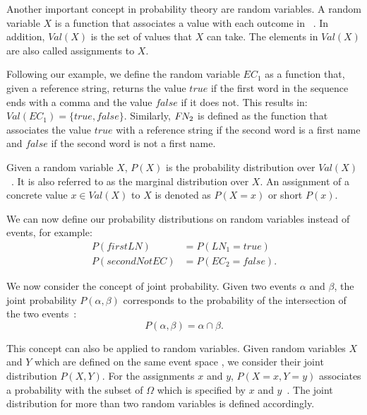 \bigskip

Another important concept in probability theory are \glspl{random variable}.
A \gls{random variable} $X$ is a \gls{function} that associates a value with each outcome in ~\cite{koller2009probabilistic}.
In addition, $\mathit{Val}(X)$ is the set of values that $X$ can take.
The elements in $\mathit{Val}(X)$ are also called \glspl{assignment} to $X$.

Following our example, we define the \gls{random variable} $EC_1$ as a \gls{function} that, given a reference string, returns the value $\mathit{true}$ if the first word in the sequence ends with a comma and the value $\mathit{false}$ if it does not.
This results in: $\mathit{Val}(EC_1)=\{\mathit{true}, \mathit{false}\}$.
Similarly, $F\hspace{-0.07em} N_2$ is defined as the function that associates the value $\mathit{true}$ with a reference string if the second word is a first name and $\mathit{false}$ if the second word is not a first name.

\bigskip

Given a \gls{random variable} $X$, $P(X)$ is the \gls{probability distribution} over $\mathit{Val}(X)$~\cite{koller2009probabilistic}.
It is also referred to as the \gls{marginal distribution} over $X$.
An \gls{assignment} of a concrete value $x\in \mathit{Val}(X)$ to $X$ is denoted as $P(X=x)$ or short $P(x)$.

We can now define our \glspl{probability distribution} on \glspl{random variable} instead of \glspl{event}, for example:
\begin{equation*}
  \begin{split}
    P(\mathit{firstLN})&= P(LN_1{=}\mathit{true})\\
    P(\mathit{secondNotEC})&= P(EC_2{=}\mathit{false}).
  \end{split}
\end{equation*}

\bigskip

We now consider the concept of \gls{joint probability}.
Given two \glspl{event} $\alpha$ and $\beta$, the \gls{joint probability} $P(\alpha,\beta)$ corresponds to the probability of the intersection of the two events~\citep{teschl2007mathematik}:
\begin{equation*}
  P(\alpha,\beta)=\alpha\cap\beta.
\end{equation*}

This concept can also be applied to \glspl{random variable}.
Given \glspl{random variable} $X$ and $Y$ which are defined on the same \gls{event space} , we consider their \gls{joint distribution} $P(X,Y)$.
For the \glspl{assignment} $x$ and $y$, $P(X{=}x,Y{=}y)$ associates a probability with the subset of $\Omega$ which is specified by  $x$ and $y$~\citep{koller2009probabilistic}.
The \gls{joint distribution} for more than two \glspl{random variable} is defined accordingly.

